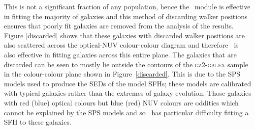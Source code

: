 This is not a significant fraction of any population, hence the \starpy~module is effective in fitting the majority of galaxies and this method of discarding walker positions ensures that poorly fit galaxies are removed from the analysis of the results. Figure \ref{discarded} shows that these galaxies with discarded walker positions are also scattered across the optical-NUV colour-colour diagram and therefore \starpy~is also effective in fitting galaxies across this entire plane. The galaxies that are discarded can be seen to mostly lie outside the contours of the \textsc{gz2-galex} sample in the colour-colour plane shown in Figure~\ref{discarded}. This is due to the SPS models used to produce the SEDs of the model SFHs; these models are calibrated with typical galaxies rather than the extremes of galaxy evolution. Those galaxies with red (blue) optical colours but blue (red) NUV colours are oddities which cannot be explained by the SPS models and so \starpy~has particular difficulty fitting a SFH to these galaxies.

\begin{table}
\end{table}

